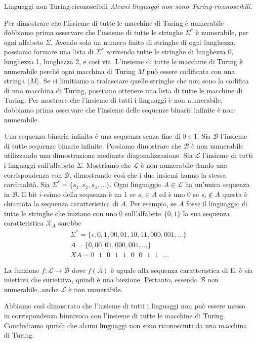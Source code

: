 \begin{Thm}{Linguaggi non Turing-riconoscibili}{}
\textit{Alcuni linguaggi non sono Turing-riconoscibili.}

\begin{demonstration}
Per dimostrare che l'insieme di tutte le macchine di Turing è numerabile dobbiamo prima osservare che l'insieme di tutte le stringhe $\Sigma^*$ è numerabile, per ogni alfabeto $\Sigma$. Avendo solo un numero finito di stringhe di ogni lunghezza, possiamo formare una lista di $\Sigma^*$ scrivendo tutte le stringhe di lunghezza 0, lunghezza 1, lunghezza 2, e così via. L'insieme di tutte le macchine di Turing è numerabile perché ogni macchina di Turing $M$ può essere codificata con una stringa $\langle M\rangle$. Se ci limitiamo a tralasciare quelle stringhe che non sono la codifica di una macchina di Turing, possiamo ottenere una lista di tutte le macchine di Turing. Per mostrare che l'insieme di tutti i linguaggi è non numerabile, dobbiamo prima osservare che l'insieme delle sequenze binarie infinite è non-numerabile.

Una sequenza binaria infinita è una sequenza senza fine di 0 e 1. Sia $\mathcal{B}$ l'insieme di tutte sequenze binarie infinite. Possiamo dimostrare che $\mathcal{B}$ è non numerabile utilizzando una dimostrazione mediante diagonalizzazione. Sia $\mathcal{L}$ l'insieme di tutti i linguaggi sull'alfabeto $\Sigma$. Mostriamo che $\mathcal{L}$ è non-numerabile dando una corrispondenza con $\mathcal{B}$, dimostrando così che i due insiemi hanno la stessa cardinalità. Sia $\Sigma^* =\{ s_{1}, s_{2}, s_{3} ,...\}$. Ogni linguaggio $A \in \mathcal{L}$ ha un'unica sequenza in $\mathcal{B}$. Il bit $i$-esimo della sequenza è un 1 se $s_{i} \in A$ ed è uno 0 se $s_{i} \notin A$ questa è chiamata la sequenza caratteristica di $A$. Per esempio, se $A$ fosse il linguaggio di tutte le stringhe che iniziano con uno 0 sull'alfabeto $\{0, 1\}$ la sua sequenza caratteristica $\mathcal{X}_{A}$ sarebbe
\begin{gather*}
\Sigma^* = \{\epsilon, 0, 1, 00, 01, 10, 11,000,001,...\}\\
A = \{0, 00, 01,000,001,...\}\\
XA=0\textit{ }1\textit{ }0\textit{ }1\textit{ }1\textit{ }0\textit{ }0\textit{ }1\textit{ }1\textit{ }...
\end{gather*}

La funzione $f:\mathcal{L}\to \mathcal{B}$ dove $f(A)$ è uguale alla sequenza caratteristica di E, è sia iniettiva che suriettiva, quindi è una biezione. Pertanto, essendo $\mathcal{B}$ non numerabile, anche $\mathcal{L}$ è non numerabile.

Abbiamo così dimostrato che l'insieme di tutti i linguaggi non può essere messo in corrispondenza biunivoca con l'insieme di tutte le macchine di Turing. Concludiamo quindi che alcuni linguaggi non sono riconosciuti da una macchina di Turing.   
\end{demonstration}
\end{Thm}

